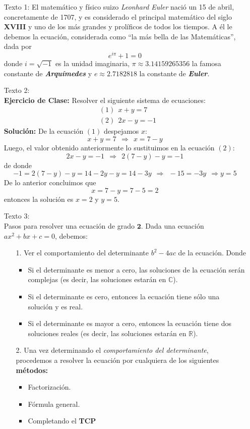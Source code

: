 \documentclass[12pt]{article}
\begin{document}
\begin{enumerate}
    \item[] Texto 1: El matemático y físico suizo \textit{Leonhard Euler} nació un 15 de abril, concretamente de 1707, y es considerado el principal matemático del siglo \textbf{XVIII} y uno de los más grandes y prolíficos de todos los tiempos. A él le debemos la ecuación, considerada como ``la más bella de las Matemáticas'', dada por
    \begin{equation}
        e^{i\pi}+1=0
    \end{equation}
    donde $i=\sqrt{-1}$ es la unidad imaginaria, $\pi\approx3.14159265356$ la famosa constante de \textit{\textbf{Arquímedes}} y $e\approx2.7182818$ la constante de \textbf{\textit{Euler}}.
    \item[] Texto 2:\\ \textbf{Ejercicio de Clase:} Resolver el siguiente sistema de ecuaciones:
    \begin{align*}
        &(1)\ \  x + y = 7\\
        &(2)\ \  2x - y= -1
    \end{align*}
    \textbf{Solución:} De la ecuación $(1)$ despejamos $x$:
    $$
    x+y=7 \ \ \Rightarrow \ \ x = 7-y
    $$
    Luego, el valor obtenido anteriormente lo sustituimos en la ecuación $(2)$:
    $$
    2x-y=-1 \ \ \Rightarrow \ \ 2(7-y)-y=-1
    $$
    de donde
    $$
    -1=2(7-y)-y=14-2y-y=14-3y \ \ \Rightarrow \ \ -15=-3y \ \ \Rightarrow y=5
    $$
    De lo anterior concluimos que
    $$
    x = 7-y=7-5=2
    $$
    entonces la solución es $x=2$ y $y=5$.
    \item[] Texto 3:\\
    Pasos para resolver una ecuación de grado $\mathbf{2}$. Dada una ecuación $ax^{2}+bx+c=0$, debemos:
    \begin{enumerate}
        \item[1.] Ver el comportamiento del determinante $b^{2}-4ac$ de la ecuación. Donde
        \begin{itemize}
            \item Si el determinante es menor a cero, las soluciones de la ecuación serán complejas (es decir, las soluciones estarán en $\mathbb{C}$).
            \item Si el determinante es cero, entonces la ecuación tiene sólo una solución y es real.
            \item Si el determinante es mayor a cero, entonces la ecuación tiene dos soluciones reales (es decir, las soluciones estarán en $\mathbb{R}$).
        \end{itemize}
    \item[2.] Una vez determinando el \textit{comportamiento del determinante}, procedemos a resolver la ecuación por cualquiera de los siguientes \textbf{métodos:}
        \begin{itemize}
            \item Factorización.
            \item Fórmula general.
            \item Completando el \textbf{TCP}
        \end{itemize}
    \end{enumerate}


\end{enumerate}
\end{document}
